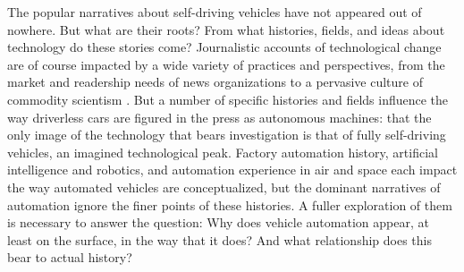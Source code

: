 

The popular narratives about self-driving vehicles have not appeared
out of nowhere. But what are their roots? From what histories, fields,
and ideas about technology do these stories come? Journalistic
accounts of technological change are of 
course impacted by a wide variety of practices and perspectives, from
the market and readership needs of news organizations to a pervasive
culture of commodity scientism \cite{smithSelling}. But a number of
specific histories and
fields influence the way driverless cars are figured in the press as
autonomous machines: that the only image of the technology that bears
investigation is that of fully self-driving vehicles, an imagined
technological peak. Factory automation history,
artificial intelligence and robotics, and automation experience in
air and space each impact the way automated vehicles are
conceptualized, but the dominant narratives of automation ignore the finer
points of these histories. A fuller exploration of them is necessary to
answer the question:  Why does vehicle
automation appear, at least on the surface, in the way that it does?
And what relationship does this bear to actual history?




